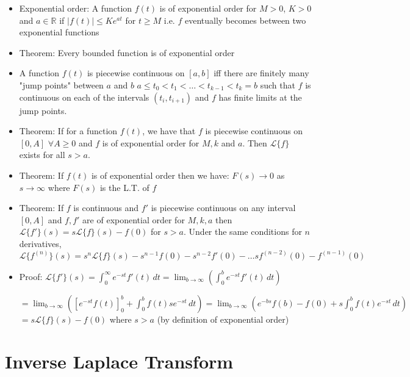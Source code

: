 \documentclass{article}
\begin{document}
\begin{itemize}
    \item Exponential order: A function $f(t)$ is of exponential order for $M > 0$, $K > 0$ and $a \in \mathbb{R} $ if $|f(t)| \leq Ke^{at}$ for $t \geq M$ i.e. $f$ eventually becomes between two exponential functions
    \item Theorem: Every bounded function is of exponential order
    \item A function $f(t)$ is piecewise continuous on $[a,b]$ iff there are finitely many "jump points" between $a$ and $b$ $a \leq t_0 < t_1 < \dots < t_{k-1} < t_k = b$ such that $f$ is continuous on each of the intervals $(t_i, t_{i+1})$ and $f$ has finite limits at the jump points.
    \item Theorem: If for a function $f(t)$, we have that $f$ is piecewise continuous on $[0, A]$ $\forall A \geq 0$ and $f$ is of exponential order for $M, k$ and $a$. Then $\mathcal{L} \{f\}$ exists for all $s > a$. 
    \item Theorem: If $f(t)$ is of exponential order then we have: $F(s) \rightarrow 0$ as $s \rightarrow \infty$ where $F(s)$ is the L.T. of $f$
    \item Theorem: If $f$ is continuous and $f'$ is piecewise continuous on any interval $[0, A]$ and $f, f'$ are of exponential order for $M, k, a$ then $\mathcal{L} \{f'\} (s) = s \mathcal{L} \{f\} (s) - f(0)$ for $s>a$. Under the same conditions for $n$ derivatives, $\mathcal{L} \{f^{(n)}\} (s) = s^n \mathcal{L} \{f\} (s) - s^{n-1} f(0) - s^{n-2} f'(0) - \dots sf^{(n-2)} (0) - f^{(n-1)} (0)$ 
    \item Proof: $\mathcal{L} \{f'\} (s) = \int_{0}^{\infty} e^{-st} f'(t) \, dt = \lim_{b \rightarrow \infty} \left(\int_{0}^{b} e^{-st} f'(t) \, dt \right) $
    
    $= \lim_{b \rightarrow \infty} \left( \left[ e^{-st} f(t) \right]_{0}^{b} + \int_{0}^{b} f(t) s e^{-st} \, dt \right) = \lim_{b \rightarrow \infty} \left( e^{-bs}f(b) - f(0) + s \int_{0}^{b} f(t) e^{-st} \, dt \right) $ 
    $= s \mathcal{L} \{f\} (s) - f(0)$ where $s > a$ (by definition of exponential order)
\end{itemize} 

\section{Inverse Laplace Transform}
\end{document}
